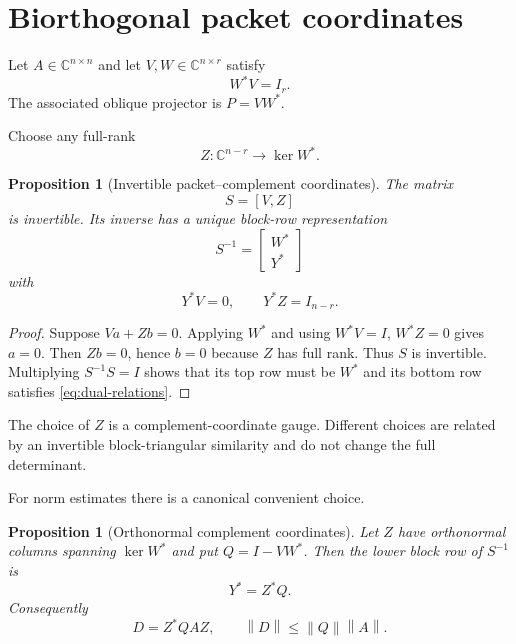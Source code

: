 \documentclass[12pt]{article}
\newtheorem{proposition}[theorem]{Proposition}
\theoremstyle{remark}
\newcommand{\norm}[1]{\left\lVert#1\right\rVert}
\begin{document}
\section{Biorthogonal packet coordinates}

Let $A\in\mathbb C^{n\times n}$ and let
$V,W\in\mathbb C^{n\times r}$ satisfy
\begin{equation}\label{eq:biorthogonal}
 W^*V=I_r.
\end{equation}
The associated oblique projector is $P=VW^*$.

Choose any full-rank
\begin{equation}\label{eq:Z}
 Z:\mathbb C^{n-r}\longrightarrow\ker W^*.
\end{equation}

\begin{proposition}[Invertible packet--complement coordinates]\label{prop:coordinates}
The matrix
\begin{equation}\label{eq:S}
 S=[V,Z]
\end{equation}
is invertible.  Its inverse has a unique block-row representation
\begin{equation}\label{eq:Sinv}
 S^{-1}=\begin{bmatrix}W^*\\Y^*\end{bmatrix}
\end{equation}
with
\begin{equation}\label{eq:dual-relations}
 Y^*V=0,
 \qquad Y^*Z=I_{n-r}.
\end{equation}
\end{proposition}

\begin{proof}
Suppose $Va+Zb=0$.  Applying $W^*$ and using
$W^*V=I$, $W^*Z=0$ gives $a=0$.  Then $Zb=0$, hence $b=0$ because $Z$ has
full rank.  Thus $S$ is invertible.  Multiplying $S^{-1}S=I$ shows that its
top row must be $W^*$ and its bottom row satisfies
\eqref{eq:dual-relations}.
\end{proof}

The choice of $Z$ is a complement-coordinate gauge.  Different choices are
related by an invertible block-triangular similarity and do not change the
full determinant.

For norm estimates there is a canonical convenient choice.

\begin{proposition}[Orthonormal complement coordinates]\label{prop:orthonormal-complement}
Let $Z$ have orthonormal columns spanning $\ker W^*$ and put
$Q=I-VW^*$.  Then the lower block row of $S^{-1}$ is
\begin{equation}\label{eq:Y-orthonormal}
 Y^*=Z^*Q.
\end{equation}
Consequently
\begin{equation}\label{eq:D-orthonormal}
 D=Z^*QAZ,
 \qquad
 \norm D\le\norm Q\norm A.
\end{equation}
\end{proposition}
\end{document}
